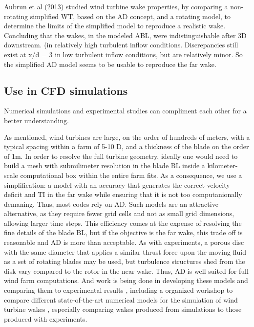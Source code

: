 Aubrun et al (2013) \cite{Aubrun2013} studied wind turbine wake properties, by comparing a non-rotating simplified WT, based on the AD concept, and a rotating model, to determine the limits of the simplified model to reproduce a realistic wake. Concluding that the wakes, in the modeled ABL, were indistinguishable after 3D downstream. (in relatively high turbulent inflow conditions. Discrepancies still exist at x/d = 3 in low turbulent inflow conditions, but are relatively minor.  So the simplified AD model seems to be usable to reproduce the far wake. 





\subsection{Use in CFD simulations}

Numerical simulations and experimental studies can compliment each other for a better understanding. 

As mentioned, wind turbines are large, on the order of hundreds of meters, with a typical spacing within a farm of 5-10 D, and a thickness of the blade on the order of 1m. In order to resolve the full turbine geometry, ideally one would need to build a mesh with submilimeter resolution in the blade BL inside a kilometer-scale computational box within the entire farm fits. As a consequence, we use a simplification: a model with an accuracy that generates the correct velocity deficit and TI in the far wake while ensuring that it is not too computanionally demaning. Thus, most codes rely on AD. \cite{Tossas2014} \cite{LignaroloWorkshop2016} \cite{Harrison2010} Such models are an attractive alternative, as they require fewer grid cells and not as small grid dimensions, allowing larger time steps. This efficiency comes at the expense of resolving the fine details of the blade BL, but if the objective is the far wake, this trade off is reasonable and AD is more than acceptable. As with experiments, a porous disc with the same diameter that applies a similar thrust force upon the moving fluid as a set of rotating blades may be used, but turbulence structures shed from the disk vary compared to the rotor in the near wake. Thus, AD is well suited for full wind farm computations. And work is being done in developing these models and comparing them to experimental results \cite{Harrison2010} \cite{Tossas2014}, including a organized workshop to compare different state-of-the-art numerical models for the simulation of wind turbine wakes \cite{LignaroloWorkshop2016}, especially comparing wakes produced from simulations to those produced with experiments. 

